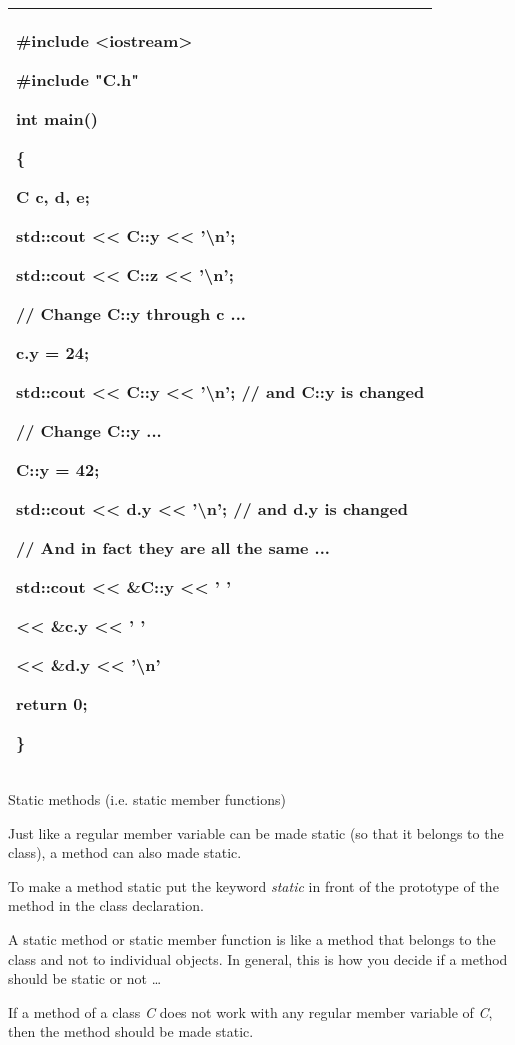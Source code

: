 \documentclass[
]{article}
\begin{document}
\begin{longtable}[]{@{}l@{}}
\toprule
\endhead
\begin{minipage}[t]{0.97\columnwidth}\raggedright
\#include \textless iostream\textgreater{}

\#include "C.h"

int main()

\{

C c, d, e;

std::cout \textless\textless{} C::y \textless\textless{}
'\textbackslash n';

std::cout \textless\textless{} C::z \textless\textless{}
'\textbackslash n';

// Change C::y through c ...

c.y = 24;

std::cout \textless\textless{} C::y \textless\textless{}
'\textbackslash n'; // and C::y is changed

// Change C::y ...

C::y = 42;

std::cout \textless\textless{} d.y \textless\textless{}
'\textbackslash n'; // and d.y is changed

// And in fact they are all the same ...

std::cout \textless\textless{} \&C::y \textless\textless{} ' '

\textless\textless{} \&c.y \textless\textless{} ' '

\textless\textless{} \&d.y \textless\textless{} '\textbackslash n'

return 0;

\}\strut
\end{minipage}\tabularnewline
\bottomrule
\end{longtable}

Static methods (i.e. static member functions)

Just like a regular member variable can be made static (so that it
belongs to the class), a method can also made static.

To make a method static put the keyword \emph{static} in front of the
prototype of the method in the class declaration.

A static method or static member function is like a method that belongs
to the class and not to individual objects. In general, this is how you
decide if a method should be static or not \ldots{}

If a method of a class \emph{C} does not work with any regular member
variable of \emph{C}, then the method should be made static.
\end{document}
